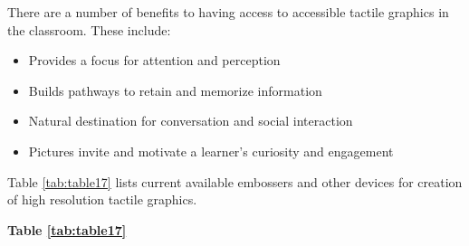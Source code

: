 There are a number of benefits to having access to accessible tactile graphics in the classroom. These include:
\begin{itemize}[leftmargin=*]
	\item Provides a focus for attention and perception
	\item Builds pathways to retain and memorize information
	\item Natural destination for conversation and social interaction
	\item Pictures invite and motivate a learner's curiosity and engagement
\end{itemize}
Table \ref{tab:table17} lists current available embossers and other devices for creation of high resolution tactile graphics.


\pagebreak 
\large\textbf{Table \ref{tab:table17}}\normalfont 
